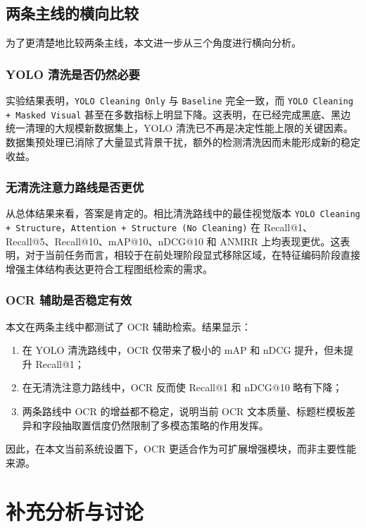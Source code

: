 \subsection{两条主线的横向比较}

为了更清楚地比较两条主线，本文进一步从三个角度进行横向分析。

\subsubsection{YOLO 清洗是否仍然必要}

实验结果表明，\texttt{YOLO Cleaning Only} 与 \texttt{Baseline} 完全一致，而 \texttt{YOLO Cleaning + Masked Visual} 甚至在多数指标上明显下降。这表明，在已经完成黑底、黑边统一清理的大规模新数据集上，YOLO 清洗已不再是决定性能上限的关键因素。数据集预处理已消除了大量显式背景干扰，额外的检测清洗因而未能形成新的稳定收益。

\subsubsection{无清洗注意力路线是否更优}

从总体结果来看，答案是肯定的。相比清洗路线中的最佳视觉版本 \texttt{YOLO Cleaning + Structure}，\texttt{Attention + Structure (No Cleaning)} 在 Recall@1、Recall@5、Recall@10、mAP@10、nDCG@10 和 ANMRR 上均表现更优。这表明，对于当前任务而言，相较于在前处理阶段显式移除区域，在特征编码阶段直接增强主体结构表达更符合工程图纸检索的需求。

\subsubsection{OCR 辅助是否稳定有效}

本文在两条主线中都测试了 OCR 辅助检索。结果显示：
\begin{enumerate}
  \item 在 YOLO 清洗路线中，OCR 仅带来了极小的 mAP 和 nDCG 提升，但未提升 Recall@1；
  \item 在无清洗注意力路线中，OCR 反而使 Recall@1 和 nDCG@10 略有下降；
  \item 两条路线中 OCR 的增益都不稳定，说明当前 OCR 文本质量、标题栏模板差异和字段抽取置信度仍然限制了多模态策略的作用发挥。
\end{enumerate}

因此，在本文当前系统设置下，OCR 更适合作为可扩展增强模块，而非主要性能来源。

\section{补充分析与讨论}

